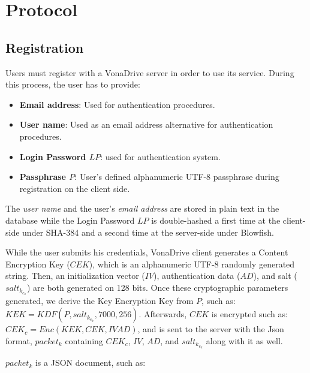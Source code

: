 \documentclass[a4paper,10pt]{article}
\begin{document}
\section{Protocol}
\subsection{Registration}
Users must register with a VonaDrive server in order to use its service. During this process, the user has to provide:

\begin{itemize}
    \item \textbf{Email address}: Used for authentication procedures.
    \item \textbf{User name}: Used as an email address alternative for authentication procedures.
    \item \textbf{Login Password $LP$}: used for authentication system.
    \item \textbf{Passphrase $P$}:
		User's defined alphanumeric UTF-8 passphrase during registration on the client side.
\end{itemize}

The \emph{user name} and the user's \emph{email address} are stored in plain text in the database while the Login
Password $LP$ is double-hashed a first time at the client-side under SHA-384 and a second time at the server-side
under Blowfish.

\vspace{5mm}

While the user submits his credentials, VonaDrive client generates a Content Encryption Key ($CEK$),
which is an alphanumeric UTF-8 randomly generated string.
Then, an initialization vector ($IV$), authentication data ($AD$), and salt ($salt_k_e_k$) are both generated on 128 bits.
Once these cryptographic parameters generated, we derive the Key Encryption Key from $P$, such as: $KEK=KDF(P, salt_k_e_k, 7000, 256)$.
Afterwards, $CEK$ is encrypted such as: $CEK_c=Enc(KEK, CEK, IV AD)$, and is sent to the server with the Json format, $packet_k$ containing
$CEK_c$, $IV$, $AD$, and $salt_k_e_k$ along with it as well.

\vspace{5mm}

$packet_k$ is a JSON document, such as:

\end{document}
